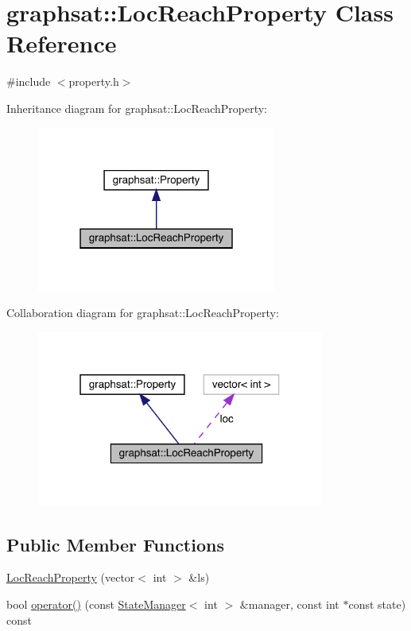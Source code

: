 \hypertarget{classgraphsat_1_1_loc_reach_property}{}\section{graphsat\+::Loc\+Reach\+Property Class Reference}
\label{classgraphsat_1_1_loc_reach_property}


{\ttfamily \#include $<$property.\+h$>$}



Inheritance diagram for graphsat\+::Loc\+Reach\+Property\+:\nopagebreak
\begin{figure}[H]
\begin{center}
\leavevmode
\includegraphics[width=223pt]{classgraphsat_1_1_loc_reach_property__inherit__graph}
\end{center}
\end{figure}


Collaboration diagram for graphsat\+::Loc\+Reach\+Property\+:\nopagebreak
\begin{figure}[H]
\begin{center}
\leavevmode
\includegraphics[width=268pt]{classgraphsat_1_1_loc_reach_property__coll__graph}
\end{center}
\end{figure}
\subsection*{Public Member Functions}
\begin{DoxyCompactItemize}
\item 
\mbox{\hyperlink{classgraphsat_1_1_loc_reach_property_a744b9271c3985407fb613ebf30ea259c}{Loc\+Reach\+Property}} (vector$<$ int $>$ \&ls)
\item 
bool \mbox{\hyperlink{classgraphsat_1_1_loc_reach_property_a79c9d5f4ad6aa9ccf0033d1c5b06ddb8}{operator()}} (const \mbox{\hyperlink{classgraphsat_1_1_state_manager}{State\+Manager}}$<$ int $>$ \&manager, const int $\ast$const state) const
\end{DoxyCompactItemize}
